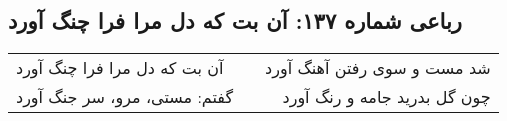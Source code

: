 \begin{center}
\section*{رباعی شماره ۱۳۷: آن بت که دل مرا فرا چنگ آورد}
\label{sec:sh137}
\begin{longtable}{l p{0.5cm} r}
آن بت که دل مرا فرا چنگ آورد
&&
شد مست و سوی رفتن آهنگ آورد
\\
گفتم: مستی، مرو، سر جنگ آورد
&&
چون گل بدرید جامه و رنگ آورد
\\
\end{longtable}
\end{center}
